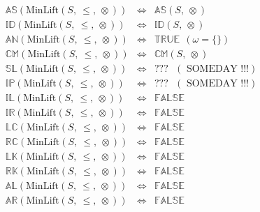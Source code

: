 \documentclass[10pt]{article}
\newcommand{\propname}[1]{{\mathbb{#1}}}
\begin{document}
\[
\begin{array}{rcl} 
\propname{AS}(\mathrm{MinLift}(S,\ \leq,\ \otimes)) 
  & \Leftrightarrow 
  & \propname{AS}(S,\ \otimes)
  \\ 
\propname{ID}(\mathrm{MinLift}(S,\ \leq,\ \otimes)) 
  & \Leftrightarrow 
  & \propname{ID}(S,\ \otimes)
  \\ 
\propname{AN}(\mathrm{MinLift}(S,\ \leq,\ \otimes)) 
  & \Leftrightarrow 
  & \propname{TRUE} \ \ (\omega = \{\})
  \\ 
\propname{CM}(\mathrm{MinLift}(S,\ \leq,\ \otimes)) 
  & \Leftrightarrow 
  & \propname{CM}(S,\ \otimes)
  \\ 
\propname{SL}(\mathrm{MinLift}(S,\ \leq,\ \otimes)) 
  & \Leftrightarrow 
  & ??? \ \ \ (\mbox{  SOMEDAY !!!})
  \\ 
\propname{IP}(\mathrm{MinLift}(S,\ \leq,\ \otimes)) 
  & \Leftrightarrow 
  & ??? \ \ \ (\mbox{  SOMEDAY !!!})
  \\ 
\propname{IL}(\mathrm{MinLift}(S,\ \leq,\ \otimes)) 
  & \Leftrightarrow 
  & \propname{FALSE} 
  \\ 
\propname{IR}(\mathrm{MinLift}(S,\ \leq,\ \otimes)) 
  & \Leftrightarrow 
  & \propname{FALSE} 
  \\ 
\propname{LC}(\mathrm{MinLift}(S,\ \leq,\ \otimes)) 
  & \Leftrightarrow 
  & \propname{FALSE} 
  \\ 
\propname{RC}(\mathrm{MinLift}(S,\ \leq,\ \otimes)) 
  & \Leftrightarrow 
  & \propname{FALSE} 
  \\ 
\propname{LK}(\mathrm{MinLift}(S,\ \leq,\ \otimes)) 
  & \Leftrightarrow 
  & \propname{FALSE} 
  \\ 
\propname{RK}(\mathrm{MinLift}(S,\ \leq,\ \otimes)) 
  & \Leftrightarrow 
  & \propname{FALSE} 
  \\ 
\propname{AL}(\mathrm{MinLift}(S,\ \leq,\ \otimes))  
  & \Leftrightarrow 
  &  \propname{FALSE} 
  \\ 
\propname{AR}(\mathrm{MinLift}(S,\ \leq,\ \otimes))  
  & \Leftrightarrow 
  & \propname{FALSE}  
  \\ 
\end{array} 
\] 
\end{document}
